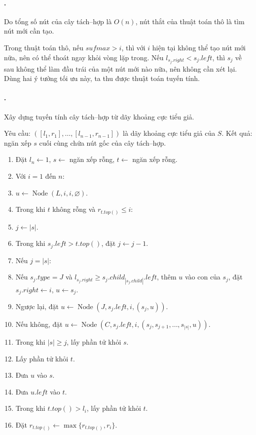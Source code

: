 \documentclass[11pt]{article}
\begin{document}
\paragraph{.}
Do tổng số nút của cây tách--hợp là $O(n)$, nút thắt của thuật toán thô là
tìm nút mới cần tạo.

Trong thuật toán thô, nếu $sufmax>i$, thì với $i$ hiện tại không thể tạo nút
mới nữa, nên có thể thoát ngay khỏi vòng lặp trong. Nếu
$l_{s_j.right}<s_j.left$, thì $s_j$ về sau không thể làm đầu trái của một nút
mới nào nữa, nên không cần xét lại. Dùng hai ý tưởng tối ưu này, ta thu được
thuật toán tuyến tính.

\paragraph{.}
Xây dựng tuyến tính cây tách--hợp từ dãy khoảng cực tiểu giả.

Yêu cầu:
$([l_1,r_1],\ldots,[l_{n-1},r_{n-1}])$ là dãy khoảng cực tiểu giả của $S$.
Kết quả: ngăn xếp $s$ cuối cùng chứa nút gốc của cây tách--hợp.
\begin{enumerate}
  \item Đặt $l_n\leftarrow1$, $s\leftarrow$ ngăn xếp rỗng,
  $t\leftarrow$ ngăn xếp rỗng.
  \item Với $i=1$ đến $n$:
  \item \quad $u\leftarrow\operatorname{Node}(L,i,i,\varnothing)$.
  \item \quad Trong khi $t$ không rỗng và $r_{t.top()}\le i$:
  \item \quad\quad $j\leftarrow |s|$.
  \item \quad\quad Trong khi $s_j.left>t.top()$, đặt $j\leftarrow j-1$.
  \item \quad\quad Nếu $j=|s|$:
  \item \quad\quad\quad Nếu $s_j.type=J$ và
  $l_{s_j.right}\ge s_j.child_{|s_j.child|}.left$, thêm $u$ vào con của $s_j$,
  đặt $s_j.right\leftarrow i$, $u\leftarrow s_j$.
  \item \quad\quad\quad Ngược lại, đặt
  $u\leftarrow\operatorname{Node}(J,s_j.left,i,(s_j,u))$.
  \item \quad\quad Nếu không, đặt
  $u\leftarrow\operatorname{Node}(C,s_j.left,i,(s_j,s_{j+1},\ldots,s_{|s|},u))$.
  \item \quad\quad Trong khi $|s|\ge j$, lấy phần tử khỏi $s$.
  \item \quad\quad Lấy phần tử khỏi $t$.
  \item \quad Đưa $u$ vào $s$.
  \item \quad Đưa $u.left$ vào $t$.
  \item \quad Trong khi $t.top()>l_i$, lấy phần tử khỏi $t$.
  \item \quad Đặt $r_{t.top()}\leftarrow\max\{r_{t.top()},r_i\}$.
\end{enumerate}
\end{document}

